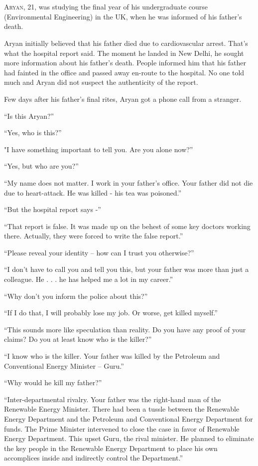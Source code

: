 \chapter{}

\lettrine{A}{ryan}, 21, was studying the final year of his undergraduate course
(Environmental Engineering) in the UK, when he was informed of his father's
death.

Aryan initially believed that his father died due to cardiovascular arrest.
That's what the hospital report said. The moment he landed in New Delhi, he
sought more information about his father's death. People informed him that his
father had fainted in the office and passed away en-route to the hospital. No
one told much and Aryan did not suspect the authenticity of the report.

Few days after his father's final rites, Aryan got a phone call from a stranger.

“Is this Aryan?”

“Yes, who is this?”

"I have something important to tell you. Are you alone now?”

“Yes, but who are you?”

“My name does not matter. I work in your father's office. Your father did not
die due to heart-attack. He was killed - his tea was poisoned.”

“But the hospital report says -”

“That report is false. It was made up on the behest of some key doctors working
there. Actually, they were forced to write the false report.”

“Please reveal your identity – how can I trust you otherwise?”

“I don't have to call you and tell you this, but your father was more than just
a colleague. He . . . he has helped me a lot in my career.”

“Why don't you inform the police about this?”

“If I do that, I will probably lose my job. Or worse, get killed myself.”

“This sounds more like speculation than reality. Do you have any proof of your
claims? Do you at least know who is the killer?”

“I know who is the killer. Your father was killed by the Petroleum and
Conventional Energy Minister – Guru.”

“Why would he kill my father?”

“Inter-departmental rivalry. Your father was the right-hand man of the Renewable
Energy Minister. There had been a tussle between the Renewable Energy Department
and the Petroleum and Conventional Energy Department for funds. The Prime Minister
intervened to close the case in favor of Renewable Energy Department. This upset
Guru, the rival minister. He planned to eliminate the key people in the
Renewable Energy Department to place his own accomplices inside and indirectly
control the Department.”

